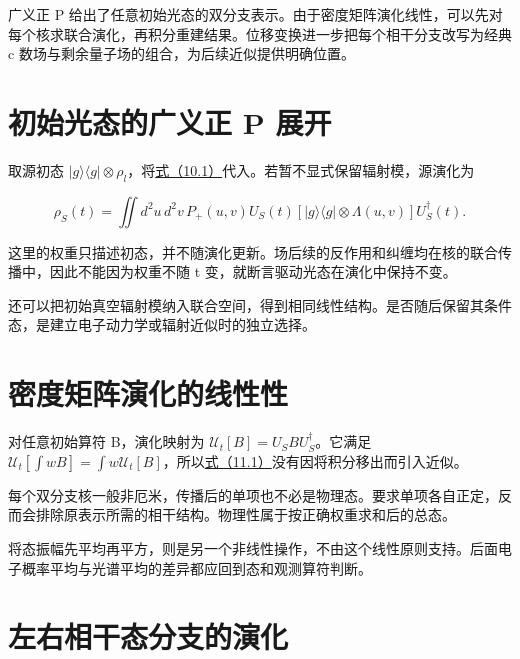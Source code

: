 \documentclass[UTF8,a4paper,zihao=-4,openany,fontset=fandol]{ctexbook}
\begin{document}
广义正 P 给出了任意初始光态的双分支表示。由于密度矩阵演化线性，可以先对每个核求联合演化，再积分重建结果。位移变换进一步把每个相干分支改写为经典 c 数场与剩余量子场的组合，为后续近似提供明确位置。



\section{初始光态的广义正 P 展开}\label{sec:11:1}


取源初态 $|g\rangle\langle g|\otimes\rho_l$，将\hyperref[eq:10.1]{式（10.1）}代入。若暂不显式保留辐射模，源演化为



\begin{equation*}
\rho_S(t)=\iint d^2u\,d^2v\,P_+(u,v)
U_S(t)\left[|g\rangle\langle g|\otimes\Lambda(u,v)\right]U_S^\dagger(t).
\tag{11.1}\label{eq:11.1}
\end{equation*}


这里的权重只描述初态，并不随演化更新。场后续的反作用和纠缠均在核的联合传播中，因此不能因为权重不随 t 变，就断言驱动光态在演化中保持不变。



还可以把初始真空辐射模纳入联合空间，得到相同线性结构。是否随后保留其条件态，是建立电子动力学或辐射近似时的独立选择。



\section{密度矩阵演化的线性性}\label{sec:11:2}


对任意初始算符 B，演化映射为 $\mathcal U_t[B]=U_SB U_S^\dagger$。它满足 $\mathcal U_t[\int wB]=\int w\mathcal U_t[B]$，所以\hyperref[eq:11.1]{式（11.1）}没有因将积分移出而引入近似。



每个双分支核一般非厄米，传播后的单项也不必是物理态。要求单项各自正定，反而会排除原表示所需的相干结构。物理性属于按正确权重求和后的总态。



将态振幅先平均再平方，则是另一个非线性操作，不由这个线性原则支持。后面电子概率平均与光谱平均的差异都应回到态和观测算符判断。



\section{左右相干态分支的演化}\label{sec:11:3}
\end{document}
